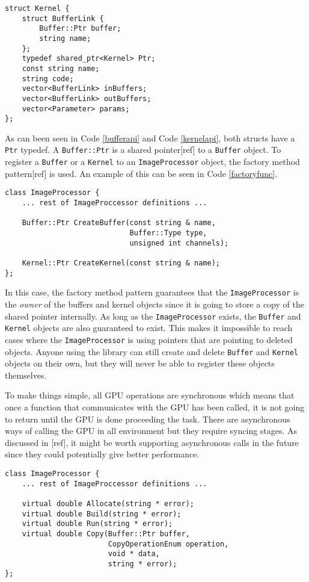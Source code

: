 \renewcommand{\lstlistingname}{Code}
\begin{lstlisting}[caption= Kernel struct, label=kernelapi]
struct Kernel {
    struct BufferLink {
        Buffer::Ptr buffer;
        string name;
    };
    typedef shared_ptr<Kernel> Ptr;
    const string name;
    string code;
    vector<BufferLink> inBuffers;
    vector<BufferLink> outBuffers;
    vector<Parameter> params;
};
\end{lstlisting}

As can been seen in Code \ref{bufferapi} and Code \ref{kernelapi}, both structs have a {\tt Ptr} typedef. A {\tt Buffer::Ptr} is a shared pointer[ref] to a {\tt Buffer} object. To register a {\tt Buffer} or a {\tt Kernel} to an {\tt ImageProcessor} object, the factory method pattern[ref] is used. An example of this can be seen in Code \ref{factoryfunc}.
\newline
\renewcommand{\lstlistingname}{Code}
\begin{lstlisting}[caption= Factory functions to create Buffer and Kernel objects, label=factoryfunc]
class ImageProcessor {
    ... rest of ImageProccessor definitions ...

    Buffer::Ptr CreateBuffer(const string & name,
                             Buffer::Type type,
                             unsigned int channels);

    Kernel::Ptr CreateKernel(const string & name);
};
\end{lstlisting}
In this case, the factory method pattern guarantees that the {\tt ImageProcessor} is the \emph{owner} of the buffers and kernel objects since it is going to store a copy of the shared pointer internally. As long as the {\tt ImageProcessor} exists, the {\tt Buffer} and {\tt Kernel} objects are also guaranteed to exist. This makes it impossible to reach cases where the {\tt ImageProcessor} is using pointers that are pointing to deleted objects. Anyone using the library can still create and delete {\tt Buffer} and {\tt Kernel} objects on their own, but they will never be able to register these objects themselves.

To make things simple, all GPU operations are synchronous which means that once a function that communicates with the GPU has been called, it is not going to return until the GPU is done proceeding the task. There are asynchronous ways of calling the GPU in all environment but they require syncing stages. As discussed in [ref], it might be worth supporting asynchronous calls in the future since they could potentially give better performance.
\newline
\renewcommand{\lstlistingname}{Code}
\begin{lstlisting}[caption= {\tt ImageProcessor} API for GPU operations, label=ipapi]
class ImageProcessor {
    ... rest of ImageProccessor definitions ...

    virtual double Allocate(string * error);
    virtual double Build(string * error);
    virtual double Run(string * error);
    virtual double Copy(Buffer::Ptr buffer,
                        CopyOperationEnum operation,
                        void * data,
                        string * error);
};
\end{lstlisting}

